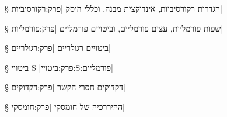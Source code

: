 \def\Title{רקע מתימטי ותיאורטי}


§ הגדרות רקורסיביות,  אינדוקצית מבנה, וכללי היסק
|פרק:רקורסיביות|


§ שפות פורמליות, עצים פורמליים, וביטויים פורמליים 
|פרק:פורמליות|


§ ביטויים רגולריים
|פרק:רגולריים|


§ ביטויי S
|פרק:ביטויי:S:פורמליים|


§ דקדוקים חסרי הקשר
|פרק:דקדוקים|


§ ההיררכיה של חומסקי
|פרק:חומסקי|


